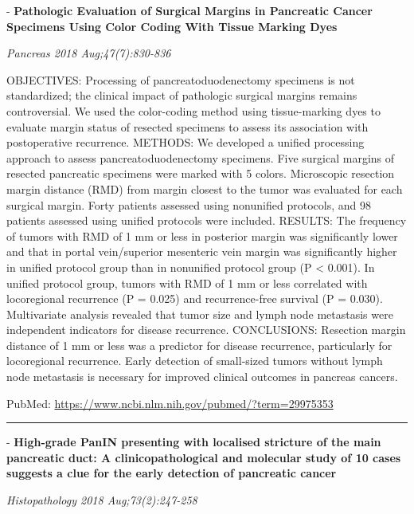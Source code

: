 \documentclass[]{article}
\begin{document}
 - \textbf{Pathologic Evaluation of Surgical Margins in Pancreatic
Cancer Specimens Using Color Coding With Tissue Marking Dyes}

\emph{Pancreas 2018 Aug;47(7):830-836}

OBJECTIVES: Processing of pancreatoduodenectomy specimens is not
standardized; the clinical impact of pathologic surgical margins remains
controversial. We used the color-coding method using tissue-marking dyes
to evaluate margin status of resected specimens to assess its
association with postoperative recurrence. METHODS: We developed a
unified processing approach to assess pancreatoduodenectomy specimens.
Five surgical margins of resected pancreatic specimens were marked with
5 colors. Microscopic resection margin distance (RMD) from margin
closest to the tumor was evaluated for each surgical margin. Forty
patients assessed using nonunified protocols, and 98 patients assessed
using unified protocols were included. RESULTS: The frequency of tumors
with RMD of 1 mm or less in posterior margin was significantly lower and
that in portal vein/superior mesenteric vein margin was significantly
higher in unified protocol group than in nonunified protocol group (P
\textless{} 0.001). In unified protocol group, tumors with RMD of 1 mm
or less correlated with locoregional recurrence (P = 0.025) and
recurrence-free survival (P = 0.030). Multivariate analysis revealed
that tumor size and lymph node metastasis were independent indicators
for disease recurrence. CONCLUSIONS: Resection margin distance of 1 mm
or less was a predictor for disease recurrence, particularly for
locoregional recurrence. Early detection of small-sized tumors without
lymph node metastasis is necessary for improved clinical outcomes in
pancreas cancers.

PubMed: \url{https://www.ncbi.nlm.nih.gov/pubmed/?term=29975353}

{}

{}

\begin{center}\rule{0.5\linewidth}{\linethickness}\end{center}

 - \textbf{High-grade PanIN presenting with localised stricture of the
main pancreatic duct: A clinicopathological and molecular study of 10
cases suggests a clue for the early detection of pancreatic cancer}

\emph{Histopathology 2018 Aug;73(2):247-258}
\end{document}

